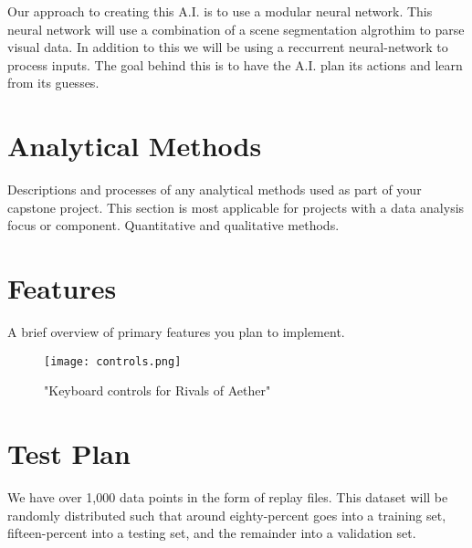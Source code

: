 Our approach to creating this A.I. is to use a modular neural network. This neural network will use a combination of a scene segmentation algrothim to parse visual data. In addition to this we will be using a reccurrent neural-network to process inputs. The goal behind this is to have the A.I. plan its actions and learn from its guesses. 




\section{Analytical Methods}

Descriptions and processes of any analytical methods used as part of your capstone project. This section is most applicable for projects with a data analysis focus or component. Quantitative and qualitative methods.




\section{Features}

A brief overview of primary features you plan to implement.

\begin{figure}
	\caption{"Keyboard controls for Rivals of Aether"}
	\centering
	\texttt{[image: controls.png]} \\
\end{figure}




\section{Test Plan}

We have over 1,000 data points in the form of replay files. This dataset will be randomly distributed such that around eighty-percent goes into a training set, fifteen-percent into a testing set, and the remainder into a validation set.

